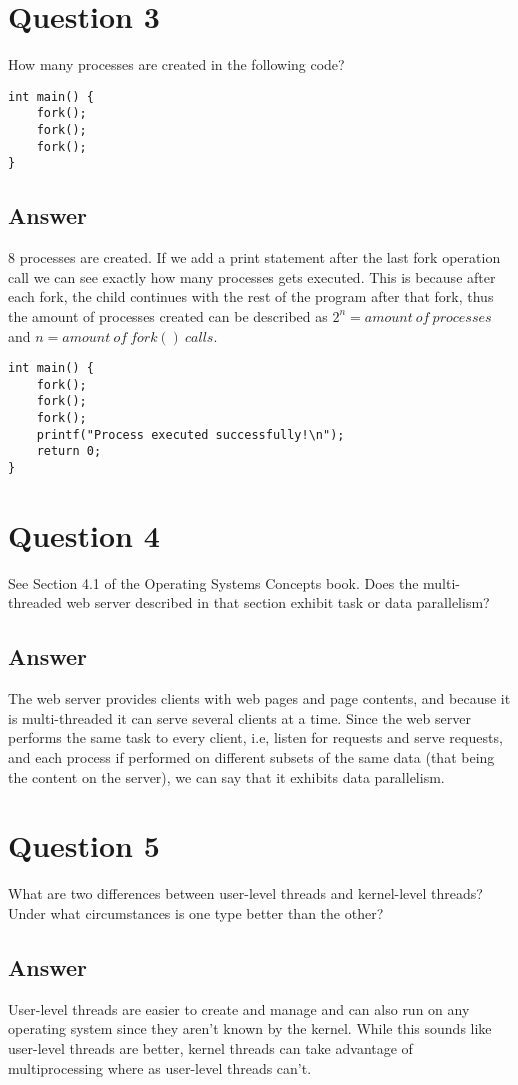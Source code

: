 \documentclass[a4paper,11pt]{article}
\begin{document}
\pagebreak
\section{Question 3}
How many processes are created in the following code?
\begin{verbatim}
int main() {
    fork();
    fork();
    fork();
}
\end{verbatim}
\subsection{Answer}
8 processes are created. If we add a print statement after the last fork operation call we can see exactly how many processes gets executed. This is because after each fork, the child continues with the rest of the program after that fork, thus the amount of processes created can be described as $2^n = amount\ of\ processes$ and $n = amount\ of\ fork()\ calls$.
\begin{verbatim}
int main() {
    fork();
    fork();
    fork();
    printf("Process executed successfully!\n");
    return 0;
}
\end{verbatim}


\section{Question 4}
See Section 4.1 of the Operating Systems Concepts book. Does the multi-threaded web server described
in that section exhibit task or data parallelism?
\subsection{Answer}
The web server provides clients with web pages and page contents, and because it is multi-threaded it can serve several clients at a time. Since the web server performs the same task to every client, i.e, listen for requests and serve requests, and each process if performed on different subsets of the same data (that being the content on the server), we can say that it exhibits data parallelism.


\pagebreak
\section{Question 5}
What are two differences between user-level threads and kernel-level threads? Under what circumstances
is one type better than the other?
\subsection{Answer}
User-level threads are easier to create and manage and can also run on any operating system since they aren't known by the kernel. While this sounds like user-level threads are better, kernel threads can take advantage of multiprocessing where as user-level threads can't.
\end{document}
